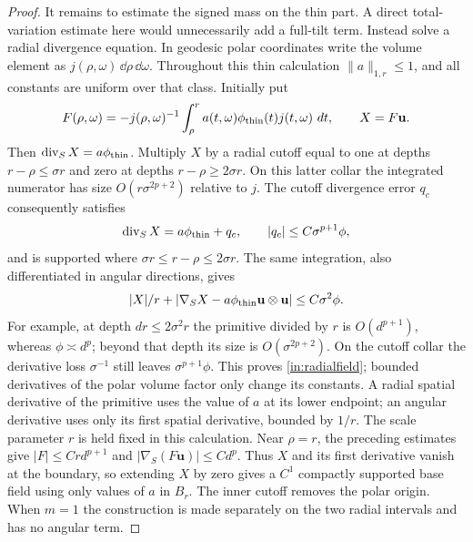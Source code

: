 \begin{proof}
It remains to estimate the signed mass on the thin part.  A direct
total-variation estimate here would unnecessarily add a full-tilt
term.  Instead solve a radial divergence equation.  In geodesic polar
coordinates write the volume element as $j(\rho,\omega)\,\dd\rho\,
\dd\omega$.  Throughout this thin calculation $\|a\|_{1,r}\leq1$,
and all constants are uniform over that class.  Initially put
\[
 F(\rho,\omega)=-j(\rho,\omega)^{-1}
       \int_\rho^r a(t,\omega)\phi_{\rm thin}(t)
                              j(t,\omega)\,\mathop{}\!d t,
 \qquad X=F\mathbf u.
\]
Then $\operatorname{div}_S X=a\phi_{\rm thin}$.  Multiply $X$ by a radial cutoff
equal to one at depths $r-\rho\leq\sigma r$ and zero at depths
$r-\rho\geq2\sigma r$.  On this latter collar the integrated numerator
has size $O(r\sigma^{2p+2})$ relative to $j$.  The cutoff divergence
error $q_c$ consequently satisfies
\[
 \operatorname{div}_S X=a\phi_{\rm thin}+q_c,
 \qquad |q_c|\leq C\sigma^{p+1}\phi,
\]
and is supported where $\sigma r\leq r-\rho\leq2\sigma r$.
The same integration, also differentiated in angular directions, gives
\begin{equation}\label{in:radialfield}
 |X|/r+
 |\nabla_SX-a\phi_{\rm thin}\mathbf u\otimes\mathbf u|
       \leq C\sigma^2\phi.
\end{equation}
For example, at depth $d r\leq2\sigma^2r$ the primitive divided by
$r$ is $O(d^{p+1})$, whereas $\phi\asymp d^p$; beyond that depth its
size is $O(\sigma^{2p+2})$.  On the cutoff collar the derivative loss
$\sigma^{-1}$ still leaves $\sigma^{p+1}\phi$.
This proves \eqref{in:radialfield}; bounded derivatives of the polar
volume factor only change its constants.  A radial spatial derivative
of the primitive uses the value of $a$ at its lower endpoint; an angular
derivative uses only its first spatial derivative, bounded by $1/r$.
The scale parameter $r$ is held fixed in this calculation.  Near
$\rho=r$, the preceding estimates give $|F|\leq Crd^{p+1}$ and
$|\nabla_S(F\mathbf u)|\leq Cd^p$.  Thus $X$ and its first derivative
vanish at the boundary, so extending $X$ by zero gives a $C^1$ compactly
supported base field using only values of $a$ in $B_r$.  The inner cutoff
removes the polar origin.  When $m=1$ the construction is made separately
on the two radial intervals and has no angular term.


\end{proof}
